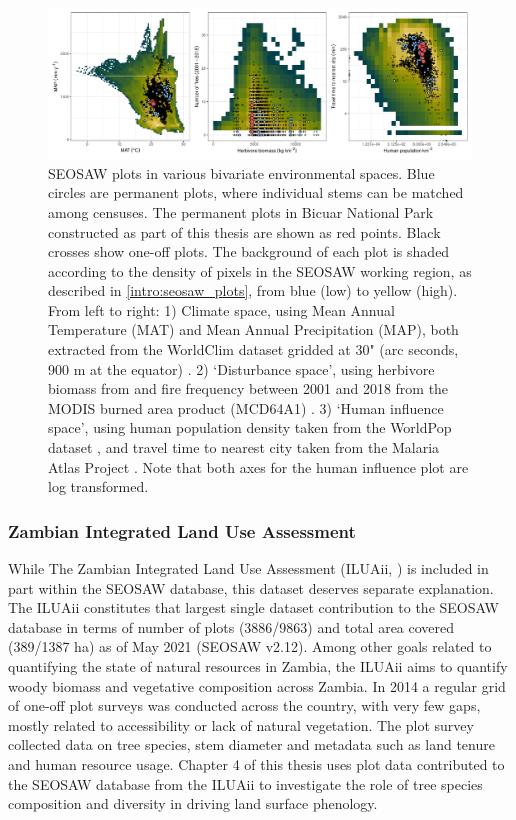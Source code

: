 \begin{refsection}
\begin{figure}[tb]
\centering
	\includegraphics[width=\textwidth]{img/seosaw_space_all}
	\caption[Distribution of SEOSAW plots in environmental space]{SEOSAW plots in various bivariate environmental spaces. Blue circles are permanent plots, where individual stems can be matched among censuses. The permanent plots in Bicuar National Park constructed as part of this thesis are shown as red points. Black crosses show one-off plots. The background of each plot is shaded according to the density of pixels in the SEOSAW working region, as described in \autoref{intro:seosaw_plots}, from blue (low) to yellow (high). From left to right: 1) Climate space, using Mean Annual Temperature (MAT) and Mean Annual Precipitation (MAP), both extracted from the WorldClim dataset gridded at 30" (arc seconds, \textapprox{}900 m at the equator) \citep{Fick2017}. 2) `Disturbance space', using herbivore biomass from \citet{Hempson2017} and fire frequency between 2001 and 2018 from the MODIS burned area product (MCD64A1) \citep{MCD64A1}. 3) `Human influence space', using human population density taken from the WorldPop dataset \citep{Linard2012}, and travel time to nearest city taken from the Malaria Atlas Project \citep{Meijer2018}. Note that both axes for the human influence plot are log transformed.}
	\label{intro:seosaw_space_all}
\end{figure}

\subsubsection{Zambian Integrated Land Use Assessment}
\label{intro:sssec:iluaii}

While The Zambian Integrated Land Use Assessment (ILUAii, \citealt{Mukosha2009}) is included in part within the SEOSAW database, this dataset deserves separate explanation. The ILUAii constitutes that largest single dataset contribution to the SEOSAW database in terms of number of plots (3886/9863) and total area covered (389/1387 ha) as of May 2021 (SEOSAW v2.12). Among other goals related to quantifying the state of natural resources in Zambia, the ILUAii aims to quantify woody biomass and vegetative composition across Zambia. In 2014 a regular grid of one-off plot surveys was conducted across the country, with very few gaps, mostly related to accessibility or lack of natural vegetation. The plot survey collected data on tree species, stem diameter and metadata such as land tenure and human resource usage. Chapter 4 of this thesis uses plot data contributed to the SEOSAW database from the ILUAii to investigate the role of tree species composition and diversity in driving land surface phenology. 


\end{refsection}
